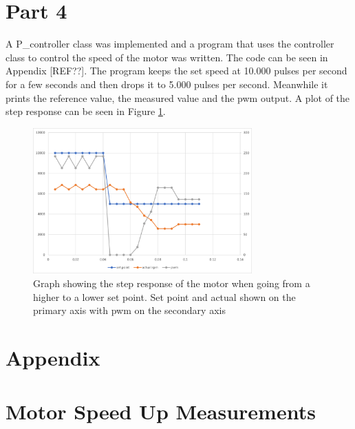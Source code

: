 \documentclass{article}
\begin{document}
\section{Part 4}
A P\_controller class was implemented and a program that uses the controller class to control the speed of the motor was written. The code can be seen in Appendix [REF??]. 
The program keeps the set speed at 10.000 pulses per second for a few seconds and then drops it to 5.000 pulses per second. Meanwhile it prints the reference value, the measured value and the pwm output. A plot of the step response can be seen in Figure \ref{fig:step_response}.

\begin{figure}[h]
    \centering
    \includegraphics[width=0.75\textwidth]{Project2SpeedController/step_response2.png}
    \caption{Graph showing the step response of the motor when going from a higher to a lower set point. Set point and actual shown on the primary axis with pwm on the secondary axis}
    \label{fig:step_response}
\end{figure}


\newpage
\section*{Appendix}
\appendix
\section{Motor Speed Up Measurements}\label{appendix:motorspeedtable}
\end{document}
